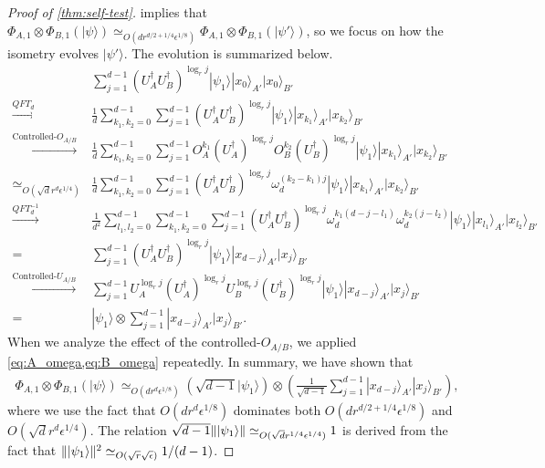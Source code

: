 \documentclass[11pt,letterpaper]{article}
\newcommand{\ket}[1]{|#1\rangle}
\newcommand{\x}{\otimes}
\newcommand{\ct}{^{\dagger}}
\DeclarePairedDelimiter{\norm}{\lVert}{\rVert}
\newcommand{\1}{\mathbb{1}}
\newcommand{\ep}{\epsilon}
\newcommand{\se}{\sqrt{\epsilon}}
\newcommand{\qe}{\epsilon^{1/4}}
\newcommand{\sd}{\sqrt{d}}
\newcommand{\sr}{\sqrt{r}}
\newcommand{\qr}{r^{1/4}}
\newcommand{\appd}[1]{\simeq_{#1}}
\theoremstyle{definition}
\begin{document}
\begin{proof}[Proof of \cref{thm:self-test}]
 implies that $ \Phi_{A,1} \x \Phi_{B,1} (\ket{\psi}) \appd{O(d r^{d/2 +1/4} \ep^{1/8})}  \Phi_{A,1} \x \Phi_{B,1} (\ket{\psi'})$,  
so we focus on how the isometry evolves $\ket{\psi'}$.
The evolution is summarized below.
	\begin{align*}
		& \sum_{j=1}^{d-1} (U_A\ct U_B\ct)^{\log_r j} \ket{\psi_1} \ket{x_0}_{A'}\ket{x_0}_{B'}\\
		\xrightarrow[]{QFT_d}& \frac{1}{d}\sum_{k_1,k_2 = 0}^{d-1} \sum_{j=1}^{d-1} (U_A\ct U_B\ct)^{\log_r j}  \ket{\psi_1}\ket{x_{k_1}}_{A'}\ket{x_{k_2}}_{B'}\\
		\xrightarrow[]{\text{Controlled-}O_{A/B}}& \frac{1}{d}\sum_{k_1,k_2 = 0}^{d-1} \sum_{j=1}^{d-1} O_A^{k_1}(U_A\ct)^{\log_r j} O_B^{k_2}(U_B\ct)^{\log_r j}
		\ket{\psi_1} \ket{x_{k_1}}_{A'}\ket{x_{k_2}}_{B'}\\
		\appd{O(\sd r^{d} \qe)}&\frac{1}{d} \sum_{k_1,k_2 = 0}^{d-1} \sum_{j=1}^{d-1} (U_A\ct U_B\ct)^{\log_r j}\omega_d^{(k_2-k_1)j}\ket{\psi_1} \ket{x_{k_1}}_{A'}\ket{x_{k_2}}_{B'}\\
		\xrightarrow[]{QFT_d^{-1}} &\frac{1}{d^2}\sum_{l_1,l_2 = 0}^{d-1}\sum_{k_1,k_2 = 0}^{d-1}\sum_{j=1}^{d-1} (U_A\ct U_B\ct)^{\log_r j} 
		\omega_d^{k_1(d-j-l_1)}\omega_d^{k_2(j-l_2)}\ket{\psi_1} \ket{x_{l_1}}_{A'}\ket{x_{l_2}}_{B'}\\
		= &\sum_{j=1}^{d-1}(U_A\ct U_B\ct)^{\log_r j} \ket{\psi_1} \ket{x_{d-j}}_{A'}\ket{x_j}_{B'} \\
		\xrightarrow[]{\text{Controlled-}U_{A/B}}& \sum_{j=1}^{d-1} U_A^{\log_r j} (U_A\ct)^{\log_r j} U_B^{\log_r j} (U_B\ct)^{\log_r j} \ket{\psi_1} \ket{x_{d-j}}_{A'}\ket{x_j}_{B'}\\
		=&\ket{\psi_1} \x \sum_{j=1}^{d-1} \ket{x_{d-j}}_{A'}\ket{x_j}_{B'}.
	\end{align*}
When we analyze the effect of the controlled-$O_{A/B}$, we applied \cref{eq:A_omega,eq:B_omega} repeatedly.
In summary, we have shown that
\begin{align}
	\Phi_{A,1}\x\Phi_{B,1}(\ket{\psi}) \appd{O(d r^{d} \ep^{1/8})} \left(\sqrt{d-1} \ket{\psi_1}\right) \x \left(\frac{1}{\sqrt{d-1}}\sum_{j=1}^{d-1} \ket{x_{d-j}}_{A'}\ket{x_j}_{B'}\right),
\end{align}
where we use the fact that $O(d r^{d} \ep^{1/8})$ dominates both $O(d r^{d/2+1/4} \ep^{1/8})$ and 
$O(\sd r^{d} \qe)$.
The relation $ \sqrt{d-1} \norm{\ket{\psi_1}} \appd{O(\sd \qr\qe)} 1$ is derived from the fact that
$\norm{\ket{\psi_1}}^2 \appd{O(\sr \se)} 1/(d-1)$.


\end{proof}
\end{document}
